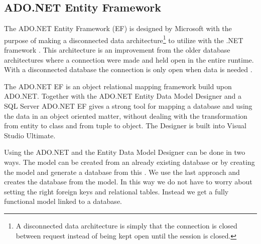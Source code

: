 \subsection{ADO.NET Entity Framework}
\label{sub:adonet}
The ADO.NET Entity Framework (EF) is designed by Microsoft with the purpose of making a disconnected data architecture\footnote{A disconnected data architecture is simply that the connection is closed between request instead of being kept open until the session is closed.} to utilize with the .NET framework \cite{adonetDesignGoal}. 
This architecture is an improvement from the older database architectures where a connection were made and held open in the entire runtime. With a disconnected database the connection is only open when data is needed \cite{disconnectedData}. 

The ADO.NET EF is an object relational mapping framework \cite{adonetEntityFramework} build upon ADO.NET. 
Together with the ADO.NET Entity Data Model Designer and a SQL Server ADO.NET EF gives a strong tool for mapping a database and using the data in an object oriented matter, without dealing with the transformation from entity to class and from tuple to object. 
The Designer is built into Visual Studio Ultimate. 

Using the ADO.NET and the Entity Data Model Designer can be done in two ways. 
The model can be created from an already existing database or by creating the model and generate a database from this \cite{adonetEntityDataModelDesigner}.
We use the last approach and creates the database from the model. 
In this way we do not have to worry about setting the right foreign keys and relational tables. Instead we get a fully functional model linked to a database. 


